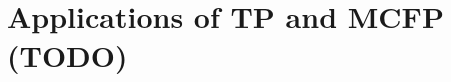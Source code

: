 \documentclass[co351.tex]{subfiles}
\begin{document}
\section{Applications of TP and MCFP (TODO)}





\end{document}
